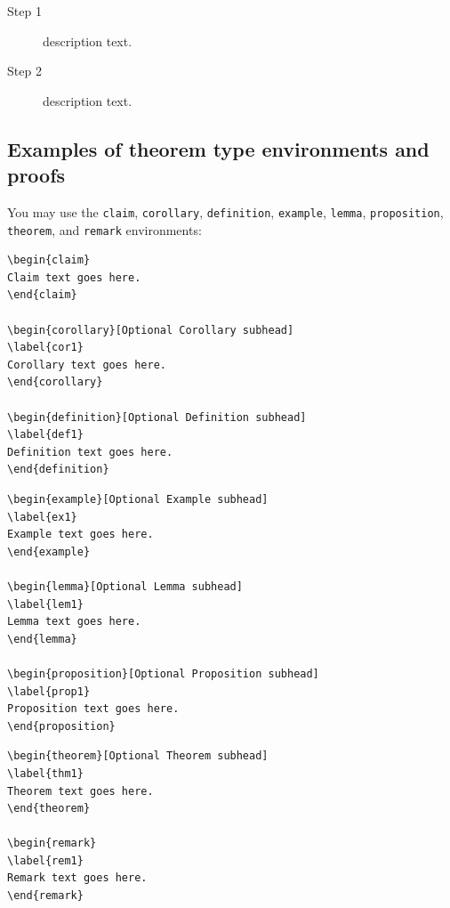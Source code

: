 \documentclass[11pt]{article}
\begin{document}
\begin{description}
\item[Step 1] description text.
\item[Step 2] description text.
\end{description}

\subsection{Examples of theorem type environments and proofs}\label{sec4}

You may use the \texttt{claim}, \texttt{corollary}, \texttt{definition}, \texttt{example}, \texttt{lemma}, \texttt{proposition}, \texttt{theorem}, and \texttt{remark} environments:
\begin{verbatim}
\begin{claim}
Claim text goes here.
\end{claim}

\begin{corollary}[Optional Corollary subhead]
\label{cor1}
Corollary text goes here.
\end{corollary}

\begin{definition}[Optional Definition subhead]
\label{def1}
Definition text goes here.
\end{definition}
\end{verbatim}


\begin{verbatim}
\begin{example}[Optional Example subhead]
\label{ex1}
Example text goes here.
\end{example}

\begin{lemma}[Optional Lemma subhead]
\label{lem1}
Lemma text goes here.
\end{lemma}
	
\begin{proposition}[Optional Proposition subhead]
\label{prop1}
Proposition text goes here.
\end{proposition}
\end{verbatim}


\begin{verbatim}
\begin{theorem}[Optional Theorem subhead]
\label{thm1}
Theorem text goes here.
\end{theorem}

\begin{remark}
\label{rem1}
Remark text goes here.
\end{remark}
\end{verbatim}
\end{document}
